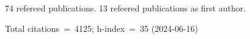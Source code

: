 74 refereed publications. 13 refeered publications as first author.

Total citations~=~4125; h-index~=~35 (2024-06-16)